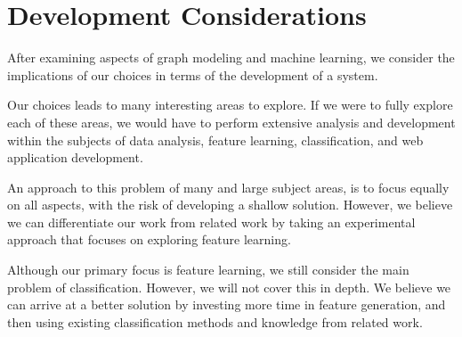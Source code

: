 \section{Development Considerations}
After examining aspects of graph modeling and machine learning, we consider the implications of our choices in terms of the development of a system.

Our choices leads to many interesting areas to explore. If we were to fully explore each of these areas, we would have to perform extensive analysis and development within the subjects of data analysis, feature learning, classification, and web application development.

An approach to this problem of many and large subject areas, is to focus equally on all aspects, with the risk of developing a shallow solution. However, we believe we can differentiate our work from related work by taking an experimental approach that focuses on exploring feature learning.



Although our primary focus is feature learning, we still consider the main problem of classification. However, we will not cover this in depth. We believe we can arrive at a better solution by investing more time in feature generation, and then using existing classification methods and knowledge from related work.


